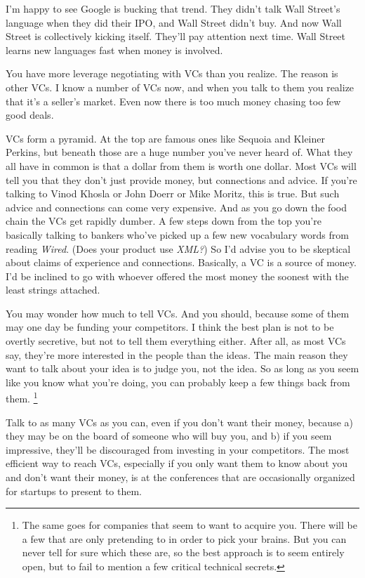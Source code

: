 \documentclass[12pt]{book}
\begin{document}
I'm happy to see Google is bucking that trend. They didn't talk Wall
Street's language when they did their IPO, and Wall Street didn't buy.
And now Wall Street is collectively kicking itself. They'll pay
attention next time. Wall Street learns new languages fast when money is
involved.

You have more leverage negotiating with VCs than you realize. The reason
is other VCs. I know a number of VCs now, and when you talk to them you
realize that it's a seller's market. Even now there is too much money
chasing too few good deals.

VCs form a pyramid. At the top are famous ones like Sequoia and Kleiner
Perkins, but beneath those are a huge number you've never heard of. What
they all have in common is that a dollar from them is worth one dollar.
Most VCs will tell you that they don't just provide money, but
connections and advice. If you're talking to Vinod Khosla or John Doerr
or Mike Moritz, this is true. But such advice and connections can come
very expensive. And as you go down the food chain the VCs get rapidly
dumber. A few steps down from the top you're basically talking to
bankers who've picked up a few new vocabulary words from reading
\emph{Wired}. (Does your product use \emph{XML?}) So I'd advise you to
be skeptical about claims of experience and connections. Basically, a VC
is a source of money. I'd be inclined to go with whoever offered the
most money the soonest with the least strings attached.

You may wonder how much to tell VCs. And you should, because some of
them may one day be funding your competitors. I think the best plan is
not to be overtly secretive, but not to tell them everything either.
After all, as most VCs say, they're more interested in the people than
the ideas. The main reason they want to talk about your idea is to judge
you, not the idea. So as long as you seem like you know what you're
doing, you can probably keep a few things back from them. \footnote{The same goes for companies that seem to want to acquire you.
There will be a few that are only pretending to in order to pick your
brains. But you can never tell for sure which these are, so the best
approach is to seem entirely open, but to fail to mention a few critical
technical secrets.}

Talk to as many VCs as you can, even if you don't want their money,
because a) they may be on the board of someone who will buy you, and b)
if you seem impressive, they'll be discouraged from investing in your
competitors. The most efficient way to reach VCs, especially if you only
want them to know about you and don't want their money, is at the
conferences that are occasionally organized for startups to present to
them.
\end{document}
